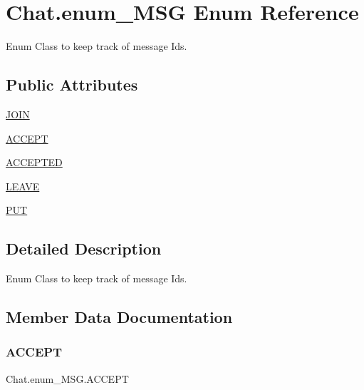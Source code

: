 \hypertarget{enum_chat_1_1enum___m_s_g}{}\section{Chat.\+enum\+\_\+\+M\+SG Enum Reference}
\label{enum_chat_1_1enum___m_s_g}


Enum Class to keep track of message Ids.  


\subsection*{Public Attributes}
\begin{DoxyCompactItemize}
\item 
\hyperlink{enum_chat_1_1enum___m_s_g_a13207b3d66634728aa90ddeaba3c07b2}{J\+O\+IN}
\item 
\hyperlink{enum_chat_1_1enum___m_s_g_a10c727775b1daf320c5e7c55cfce0c75}{A\+C\+C\+E\+PT}
\item 
\hyperlink{enum_chat_1_1enum___m_s_g_a03d71ee0b5ffa0a67aad84965832d42d}{A\+C\+C\+E\+P\+T\+ED}
\item 
\hyperlink{enum_chat_1_1enum___m_s_g_ad6d5aef8d11c44afb9c929bcad90dcaa}{L\+E\+A\+VE}
\item 
\hyperlink{enum_chat_1_1enum___m_s_g_afe9c3f90691c6e27ce6f063b24c2ba3c}{P\+UT}
\end{DoxyCompactItemize}


\subsection{Detailed Description}
Enum Class to keep track of message Ids. 

\subsection{Member Data Documentation}
\hypertarget{enum_chat_1_1enum___m_s_g_a10c727775b1daf320c5e7c55cfce0c75}{}\label{enum_chat_1_1enum___m_s_g_a10c727775b1daf320c5e7c55cfce0c75} 
\subsubsection{\texorpdfstring{A\+C\+C\+E\+PT}{ACCEPT}}
{\footnotesize\ttfamily Chat.\+enum\+\_\+\+M\+S\+G.\+A\+C\+C\+E\+PT}

